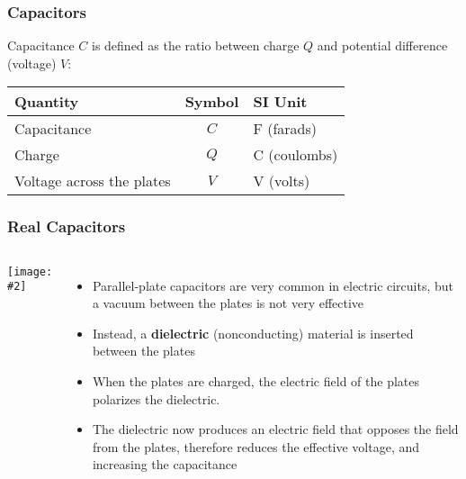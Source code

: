 \documentclass[12pt,aspectratio=169]{beamer}
\newcommand{\pic}[2]{\texttt{[image: \#2]}}
\newcommand{\eq}[2]{\vspace{#1}{\Large\begin{displaymath}#2\end{displaymath}}}
\begin{document}
\begin{frame}
  \frametitle{Capacitors}

  Capacitance $C$ is defined as the ratio between charge $Q$ and potential
  difference (voltage) $V$:
  
  \eq{-.05in}{
    \boxed{C=\frac{Q}{V}}
  }
  
  \begin{center}
    \begin{tabular}{l|c|l}
      \rowcolor{pink}
      \textbf{Quantity} & \textbf{Symbol} & \textbf{SI Unit} \\ \hline
      Capacitance   & $C$   & \si{\farad} (farads)\\
      Charge        & $Q$   & \si{\coulomb} (coulombs)\\
      Voltage across the plates & $V$ & \si{\volt} (volts)
    \end{tabular}
  \end{center}

\end{frame}

\begin{frame}
  \frametitle{Real Capacitors}
  \begin{columns}
    \pic{1.2}{Figure_20_05_05a.jpg}
    \begin{itemize}
    \item Parallel-plate capacitors are very common in electric circuits,
      but a vacuum between the plates is not very effective
    \item Instead, a \textbf{dielectric} (nonconducting) material is inserted
      between the plates
    \item When the plates are charged, the electric field of the plates
      polarizes the dielectric.
    \item The dielectric now produces an electric field that opposes the field
      from the plates, therefore reduces the effective voltage, and increasing
      the capacitance
    \end{itemize}
  \end{columns}
\end{frame}
\end{document}
